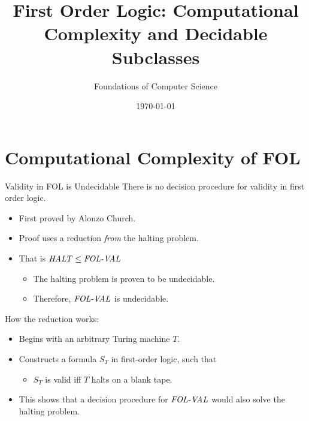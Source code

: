 \documentclass[style=sailor,size=12pt,mode=present]{powerdot}
\title{First Order Logic: Computational Complexity and Decidable Subclasses}
\author{Foundations of Computer Science}
\date{\today}
\newcommand{\id}[1]{\mbox{\it #1\/}}
\theoremstyle{definition}
\begin{document}
\maketitle
\section[slide=false]{Computational Complexity of FOL}
\begin{slide}[bm=,toc=]{Validity in FOL is Undecidable}
There is no decision procedure for validity in first order logic.
\begin{itemize}
\item First proved by Alonzo Church.
\item Proof uses a reduction \emph{from} the halting problem.
\item That is $\id{HALT} \leq \id{FOL-VAL}$
\begin{itemize}
\item The halting problem is proven to be undecidable.
\item Therefore, $\id{FOL-VAL}$ is undecidable.
\end{itemize}
\end{itemize}
How the reduction works:
\begin{itemize}
\item Begins with an arbitrary Turing machine $T$.
\item Constructs a formula $S_T$ in first-order logic, such that
\begin{itemize}
\item $S_T$ is valid iff $T$ halts on a blank tape.
\end{itemize}
\item This shows that a decision procedure for $\id{FOL-VAL}$ would also solve
the halting problem.
\end{itemize}
\end{slide}
\end{document}
